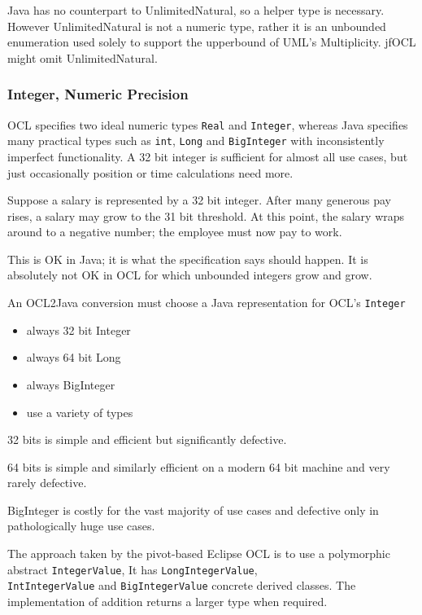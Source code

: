 \documentclass[sigconf]{acmart}
\begin{document}
Java has no counterpart to UnlimitedNatural, so a helper type is necessary. However UnlimitedNatural is not a numeric type, rather it is an unbounded enumeration used solely to support the upperbound of UML's Multiplicity. jfOCL might omit UnlimitedNatural.

\subsubsection{Integer, Numeric Precision}

OCL specifies two ideal numeric types \texttt{Real} and \texttt{Integer}, whereas Java specifies many practical types such as \texttt{int}, \texttt{Long} and \texttt{BigInteger} with inconsistently imperfect functionality. A 32 bit integer is sufficient for almost all use cases, but just occasionally position or time calculations need more.

Suppose a salary is represented by a 32 bit integer. After many generous pay rises, a salary may grow to the 31 bit threshold. At this point, the salary wraps around to a negative number; the employee must now pay to work. 

This is OK in Java; it is what the specification says should happen. It is absolutely not OK in OCL for which unbounded integers grow and grow.

An OCL2Java conversion must choose a Java representation for OCL's \texttt{Integer}
\begin{itemize}
	\item always 32 bit Integer
	\item always 64 bit Long
	\item always BigInteger
	\item use a variety of types
\end{itemize}

32 bits is simple and efficient but significantly defective.

64 bits is simple and similarly efficient on a modern 64 bit machine and very rarely defective.

BigInteger is costly for the vast majority of use cases and defective only in pathologically huge use cases.

The approach taken by the pivot-based Eclipse OCL is to use a polymorphic abstract \texttt{IntegerValue}, It has \texttt{LongIntegerValue},\\ \texttt{IntIntegerValue} and \texttt{BigIntegerValue} concrete derived classes. The implementation of addition returns a larger type when required.
\end{document}
